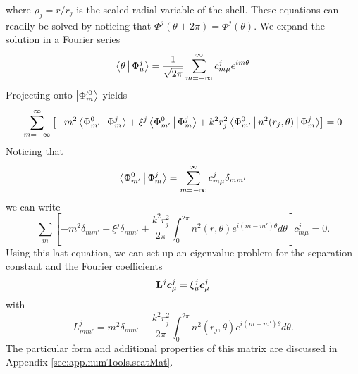 where $\rho_j=r/r_j$ is the scaled radial variable of the shell. 
These equations can readily be solved by noticing that
$\Phi^j(\theta+2\pi)=\Phi^j(\theta)$. We expand the solution
in a Fourier series
  \begin{equation}
   \Braket{\theta|\Phi_\mu^j} = \frac{1}{\sqrt{2\pi}}\sum_{m=-\infty}^\infty c_{m\mu}^je^{im\theta}
  \end{equation}
Projecting onto $\Ket{\Phi_m'^0}$ yields
\begin{equation}
    \sum_{m=-\infty}^\infty\left[-m^2\Braket{\Phi_{m'}^0|\Phi_m^j}+\xi^j\Braket{\Phi_{m'}^0|\Phi_m^j}+k^2r_j^2\Braket{\Phi_{m'}^0|n^2(r_j,\theta)|\Phi_m^j}\right]=0
  \end{equation}
Noticing that 
  \begin{equation}
    \Braket{\Phi_{m'}^0|\Phi_{m}^j} = \sum_{m=-\infty}^\infty c_{m\mu}^j \delta_{mm'}
  \end{equation}
we can write
  \begin{equation}
    \sum_m\left[-m^2\delta_{mm'}+\xi^j\delta_{mm'} + \frac{k^2r_j^2}{2\pi}\int_{0}^{2\pi}n^2(r,\theta)e^{i(m-m')\theta}d\theta\right]c_{m\mu}^j =0.
  \end{equation}
Using this last equation, we can set up an eigenvalue 
problem for the separation constant and the Fourier coefficients
  \begin{equation}
   \mathbf{L}^j\boldsymbol{c}_\mu^j=\xi_\mu^j\boldsymbol{c}_\mu^j
  \end{equation}
with
  \begin{equation}
    L_{mm'}^j = m^2\delta_{mm'}-\frac{k^2r_j^2}{2\pi}\int_0^{2\pi}n^2(r_j,\theta)e^{i(m-m')\theta}d\theta.
  \end{equation}
The particular form and additional properties of this matrix are discussed in 
Appendix \ref{sec:app.numTools.scatMat}.

